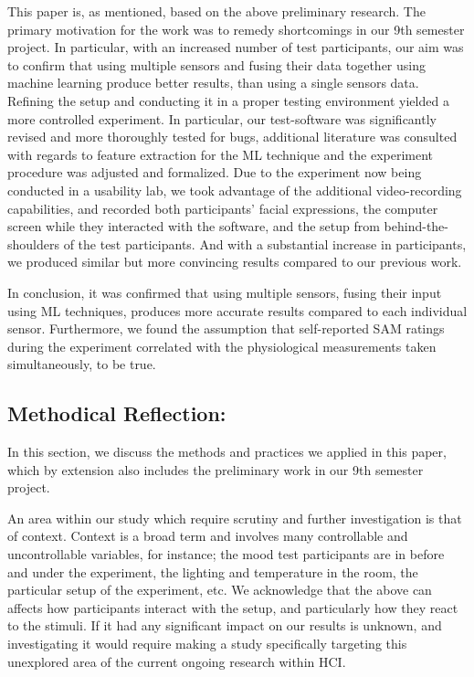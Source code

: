 This paper is, as mentioned, based on the above preliminary research. The
primary motivation for the work was to remedy shortcomings in our 9th semester
project. In particular, with an increased number of test participants, our aim
was to confirm that using multiple sensors and fusing their data together using machine learning produce better results, than using a single sensors data. Refining the
setup and conducting it in a proper testing environment yielded a more
controlled experiment. In particular, our test-software was significantly
revised and more thoroughly tested for bugs, additional literature was consulted
with regards to feature extraction for the ML technique and the experiment procedure was
adjusted and formalized. Due to the experiment now being conducted in a
usability lab, we took advantage of the additional video-recording capabilities,
and recorded both participants' facial expressions, the computer screen while
they interacted with the software, and the setup from behind-the-shoulders of
the test participants. And with a substantial increase in participants, we
produced similar but more convincing results compared to our previous work.

In conclusion, it was confirmed that using multiple sensors, fusing their input
using ML techniques, produces more accurate results compared to each individual
sensor. Furthermore, we found the assumption that self-reported SAM ratings
during the experiment correlated with the physiological measurements taken
simultaneously, to be true.

\subsection{Methodical Reflection:}
In this section, we discuss the methods and practices we applied in this paper,
which by extension also includes the preliminary work in our 9th semester
project.

An area within our study which require scrutiny and further investigation is
that of context. Context is a broad term and involves many controllable and
uncontrollable variables, for instance; the mood test participants are in
before and under the experiment, the lighting and temperature in the room, the
particular setup of the experiment, etc. We acknowledge that the above can
affects how participants interact with the setup, and particularly how they
react to the stimuli. If it had any significant impact on our results is
unknown, and investigating it would require making a study specifically targeting this unexplored area of the current ongoing research within HCI.

